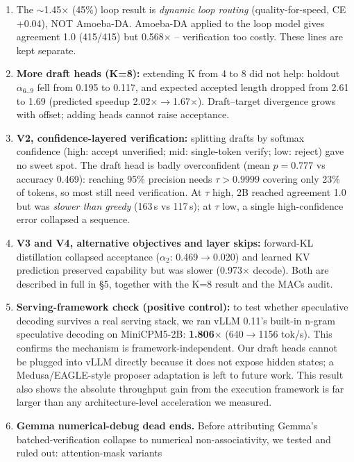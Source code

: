 \documentclass[11pt,a4paper]{article}
\begin{document}
\begin{enumerate}[leftmargin=*]
  \item The $\sim$1.45$\times$ (45\%) loop result is \emph{dynamic loop routing} (quality-for-speed,
        CE +0.04), NOT Amoeba-DA. Amoeba-DA applied to the loop model gives agreement 1.0
        (415/415) but 0.568$\times$ -- verification too costly. These lines are kept separate.
  \item \textbf{More draft heads (K=8):} extending K from 4 to 8 did not help: holdout
        $\alpha_{6..9}$ fell from 0.195 to 0.117, and expected accepted length dropped from
        2.61 to 1.69 (predicted speedup 2.02$\times\to$1.67$\times$). Draft--target divergence
        grows with offset; adding heads cannot raise acceptance.
  \item \textbf{V2, confidence-layered verification:} splitting drafts by softmax confidence
        (high: accept unverified; mid: single-token verify; low: reject) gave no sweet spot.
        The draft head is badly overconfident (mean $p=0.777$ vs accuracy 0.469): reaching
        95\% precision needs $\tau>0.9999$ covering only 23\% of tokens, so most still need
        verification. At $\tau$ high, 2B reached agreement 1.0 but was \emph{slower than greedy}
        (163\,s vs 117\,s); at $\tau$ low, a single high-confidence error collapsed a sequence.
  \item \textbf{V3 and V4, alternative objectives and layer skips:} forward-KL distillation
        collapsed acceptance ($\alpha_2$: 0.469$\to$0.020) and learned KV prediction preserved
        capability but was slower (0.973$\times$ decode). Both are described in full in \S5,
        together with the K=8 result and the MACs audit.
  \item \textbf{Serving-framework check (positive control):} to test whether speculative
        decoding survives a real serving stack, we ran vLLM 0.11's built-in n-gram speculative
        decoding on MiniCPM5-2B: \textbf{1.806$\times$} (640$\to$1156 tok/s). This confirms the
        mechanism is framework-independent. Our draft heads cannot be plugged into vLLM directly
        because it does not expose hidden states; a Medusa/EAGLE-style proposer adaptation is left
        to future work. This result also shows the absolute throughput gain from the execution
        framework is far larger than any architecture-level acceleration we measured.
  \item \textbf{Gemma numerical-debug dead ends.} Before attributing Gemma's batched-verification
        collapse to numerical non-associativity, we tested and ruled out: attention-mask variants

\end{enumerate}
\end{document}
